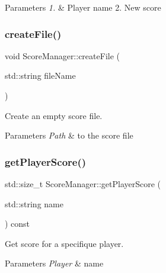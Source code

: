 \begin{DoxyParams}{Parameters}
{\em 1.} & Player name 2. New score \\
\hline
\end{DoxyParams}
\mbox{\label{classScoreManager_a93810ab5b58af22f8af96db0787363b8}} 
\subsubsection{\texorpdfstring{create\+File()}{createFile()}}
{\footnotesize\ttfamily void Score\+Manager\+::create\+File (\begin{DoxyParamCaption}\item[{std\+::string}]{file\+Name }\end{DoxyParamCaption})}



Create an empty score file. 


\begin{DoxyParams}{Parameters}
{\em Path} & to the score file \\
\hline
\end{DoxyParams}
\mbox{\label{classScoreManager_a9d529f071418d69a2b1745673d9d83b2}} 
\subsubsection{\texorpdfstring{get\+Player\+Score()}{getPlayerScore()}}
{\footnotesize\ttfamily std\+::size\+\_\+t Score\+Manager\+::get\+Player\+Score (\begin{DoxyParamCaption}\item[{std\+::string}]{name }\end{DoxyParamCaption}) const}



Get score for a specifique player. 


\begin{DoxyParams}{Parameters}
{\em Player} & name \\
\hline
\end{DoxyParams}
\mbox{\label{classScoreManager_a3644cf37cdce0983dc8ed3005222e55a}} 
